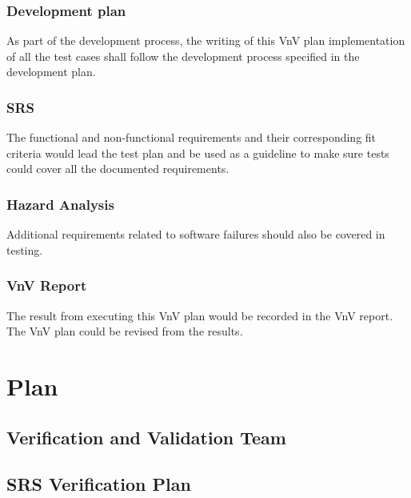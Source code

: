 \documentclass[12pt, titlepage]{article}
\begin{document}
\subsubsection{Development plan}\citet{DevelopmentPlan}
As part of the development process, the writing of this VnV plan implementation of all the test cases shall follow the development process specified in the development plan.

\subsubsection{SRS}\citet{SRS}
The functional and non-functional requirements and their corresponding fit criteria would lead the test plan and be used as a guideline to make sure tests could cover all the documented requirements.
\subsubsection{Hazard Analysis}\citet{HazardAnalysis}
Additional requirements related to software failures should also be covered in testing.
\subsubsection{VnV Report}\citet{VnVReport}
The result from executing this VnV plan would be recorded in the VnV report.  The VnV plan could be revised from the results.
\section{Plan}


\subsection{Verification and Validation Team}


\subsection{SRS Verification Plan}

\end{document}
